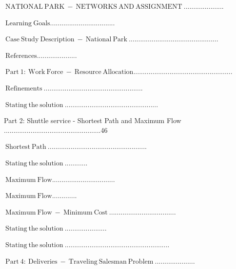 \documentclass[10pt]{article}
\begin{document}
$\mathrm{~ N A T I O N A L ~ P A R K ~ - ~ N E T W O R K S ~ A N D ~ A S S I G N M E N T ~ . . . . . . . . . . . . . . . . . . . . .}$

$\mathrm{~ L e a r n i n g ~ G o a l s . . . . . . . . . . . . . . . . . . . . . . . . . . . . . . . . . .}$

$\mathrm{~ C a s e ~ S t u d y ~ D e s c r i p t i o n ~ - ~ N a t i o n a l ~ P a r k ~ . . . . . . . . . . . . . . . . . . . . . . . . . . . . . . . . . . . . . . . . . . . . . . .}$

$\mathrm{~ R e f e r e n c e s . . . . . . . . . . . . . . . . . . . . .}$

$\mathrm{~ P a r t ~ 1 : ~ W o r k ~ F o r c e ~ - ~ R e s o u r c e ~ A l l o c a t i o n . . . . . . . . . . . . . . . . . . . . . . . . . . . . . . . . . . . . . . . . . . . . . . . . . . . .}$

$\mathrm{~ R e f i n e m e n t s ~ . . . . . . . . . . . . . . . . . . . . . . . . . . . . . . . . . . . . . . . . . . . . . . . . . . . .}$

$\mathrm{~ S t a t i n g ~ t h e ~ s o l u t i o n ~ . . . . . . . . . . . . . . . . . . . . . . . . . . . . . . . . . . . . . . . . . . . . . . . . .}$

Part 2: Shuttle service - Shortest Path and Maximum Flow ...................................................46

$\mathrm{~ S h o r t e s t ~ P a t h ~ . . . . . . . . . . . . . . . . . . . . . . . . . . . . . . . . . . . . . . . . . . . . . . . . . . . .}$

$\mathrm{~ S t a t i n g ~ t h e ~ s o l u t i o n ~ . . . . . . . . . . . .}$

$\mathrm{~ M a x i m u m ~ F l o w . . . . . . . . . . . . . . . . . . . . . . . . . . . . . . . . .}$

$\mathrm{~ M a x i m u m ~ F l o w . . . . . . . . . . . . .}$

$\mathrm{~ M a x i m u m ~ F l o w ~ - ~ M i n i m u m ~ C o s t ~ . . . . . . . . . . . . . . . . . . . . . . . . . . . . . . . . . . .}$

$\mathrm{~ S t a t i n g ~ t h e ~ s o l u t i o n ~ . . . . . . . . . . . . . . . . . . . . . .}$

$\mathrm{~ S t a t i n g ~ t h e ~ s o l u t i o n ~ . . . . . . . . . . . . . . . . . . . . . . . . . . . . . . . . . . . . . . . . . . . . . . . . . . . . . . .}$

$\mathrm{~ P a r t ~ 4 : ~ D e l i v e r i e s ~ - ~ T r a v e l i n g ~ S a l e s m a n ~ P r o b l e m ~ . . . . . . . . . . . . . . . . . . . . .}$
\end{document}
